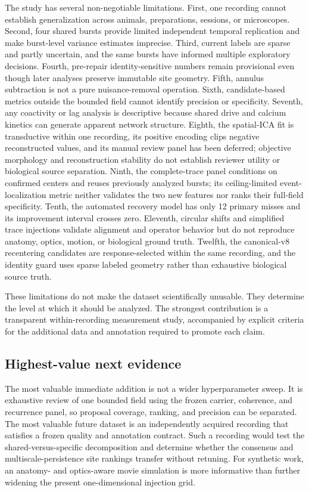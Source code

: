 The study has several non-negotiable limitations. First, one recording cannot establish generalization across animals, preparations, sessions, or microscopes. Second, four shared bursts provide limited independent temporal replication and make burst-level variance estimates imprecise. Third, current labels are sparse and partly uncertain, and the same bursts have informed multiple exploratory decisions. Fourth, pre-repair identity-sensitive numbers remain provisional even though later analyses preserve immutable site geometry. Fifth, annulus subtraction is not a pure nuisance-removal operation. Sixth, candidate-based metrics outside the bounded field cannot identify precision or specificity. Seventh, any coactivity or lag analysis is descriptive because shared drive and calcium kinetics can generate apparent network structure. Eighth, the spatial-ICA fit is transductive within one recording, its positive encoding clips negative reconstructed values, and its manual review panel has been deferred; objective morphology and reconstruction stability do not establish reviewer utility or biological source separation. Ninth, the complete-trace panel conditions on confirmed centers and reuses previously analyzed bursts; its ceiling-limited event-localization metric neither validates the two new features nor ranks their full-field specificity. Tenth, the automated recovery model has only 12 primary misses and its improvement interval crosses zero. Eleventh, circular shifts and simplified trace injections validate alignment and operator behavior but do not reproduce anatomy, optics, motion, or biological ground truth. Twelfth, the canonical-v8 recentering candidates are response-selected within the same recording, and the identity guard uses sparse labeled geometry rather than exhaustive biological source truth.



These limitations do not make the dataset scientifically unusable. They determine the level at which it should be analyzed. The strongest contribution is a transparent within-recording measurement study, accompanied by explicit criteria for the additional data and annotation required to promote each claim.

\subsection{Highest-value next evidence}

The most valuable immediate addition is not a wider hyperparameter sweep. It
is exhaustive review of one bounded field using the frozen carrier, coherence,
and recurrence panel, so proposal coverage, ranking, and precision can be
separated. The most valuable future dataset is an independently acquired
recording that satisfies a frozen quality and annotation contract. Such a
recording would test the shared-versus-specific decomposition and determine
whether the consensus and multiscale-persistence site rankings transfer without
retuning. For synthetic work, an anatomy- and optics-aware movie simulation is
more informative than further widening the present one-dimensional injection
grid.
